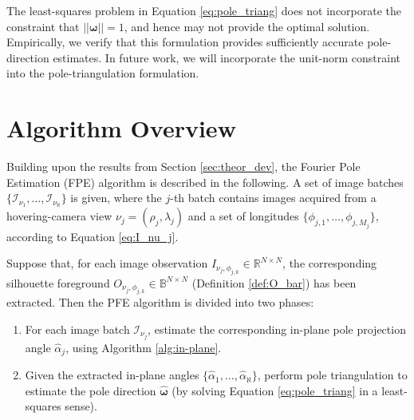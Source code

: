 The least-squares problem in Equation \ref{eq:pole_triang} does not incorporate the constraint that $||\boldsymbol{\omega}||=1$, and hence may not provide the optimal solution. Empirically, we verify that this formulation provides sufficiently accurate pole-direction estimates. In future work, we will incorporate the unit-norm constraint into the pole-triangulation formulation.


\section{Algorithm Overview}

Building upon the results from Section \ref{sec:theor_dev}, the Fourier Pole Estimation (FPE) algorithm is described in the following. A set of image batches $\{ \mathcal{I}_{\nu_1}, \dots, \mathcal{I}_{\nu_\aleph} \}$ is given, where the $j$-th batch contains images acquired from a hovering-camera view $\nu_j=(\rho_j,\lambda_j)$ and a set of longitudes $\{ \phi_{j,1}, \dots, \phi_{j,M_j} \}$, according to Equation \ref{eq:I_nu_j}.

Suppose that, for each image observation $I_{\nu_j,\phi_{j,k}}\in\mathbb{R}^{N\times N}$, the corresponding silhouette foreground $O_{\nu_j,\phi_{j,k}}\in\mathbb{B}^{N\times N}$ (Definition \ref{def:O_bar}) has been extracted. Then the PFE algorithm is divided into two phases:

\begin{enumerate}
    \item For each image batch $\mathcal{I}_{\nu_j}$, estimate the corresponding in-plane pole projection angle $\hat{\alpha}_j$, using Algorithm \ref{alg:in-plane}.
    \item Given the extracted in-plane angles $\{ \hat{\alpha}_1, \dots, \hat{\alpha}_\aleph \}$, perform pole triangulation to estimate the pole direction $\hat{\boldsymbol{\omega}}$ (by solving Equation \ref{eq:pole_triang} in a least-squares sense).
\end{enumerate}

